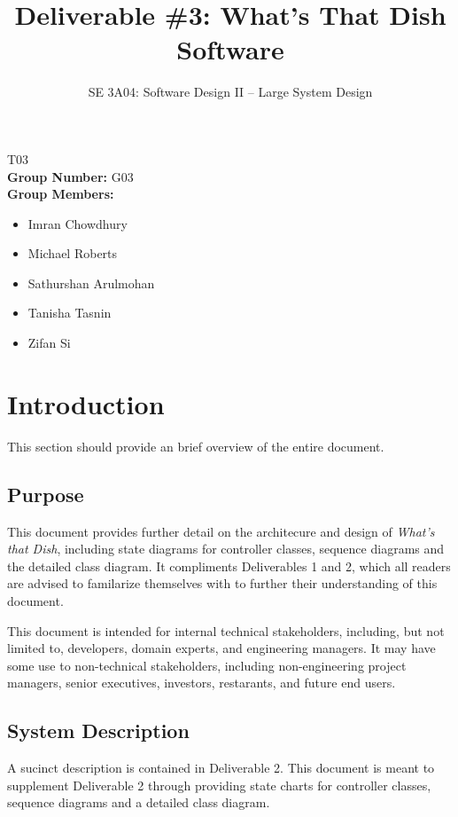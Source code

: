 \documentclass[]{article}
\title{Deliverable \#3: What’s That Dish Software}
\author{SE 3A04: Software Design II -- Large System Design}
\date{}
\begin{document}
\maketitle	
{} T03\\
{\bf Group Number:} G03 \\
{\bf Group Members:} 
\begin{itemize}
	\item Imran Chowdhury
	\item Michael Roberts
	\item Sathurshan Arulmohan
	\item Tanisha Tasnin
	\item Zifan Si
\end{itemize}

\section{Introduction}
\label{sec:introduction}

This section should provide an brief overview of the entire document.

\subsection{Purpose}
\label{sub:purpose}

This document provides further detail on the architecure and design of \textit{What's that Dish}, including state diagrams for controller classes,
sequence diagrams and the detailed class diagram. It compliments Deliverables 1 and 2, which all readers are advised to familarize themselves with
to further their understanding of this document.

This document is intended for internal technical stakeholders, including, but not limited to, developers, domain experts,
and engineering managers. It may have some use to non-technical stakeholders, including non-engineering project managers,
senior executives, investors, restarants, and future end users.

\subsection{System Description}
\label{sub:system_description}
A sucinct description is contained in Deliverable 2. This document is meant to supplement Deliverable 2 through providing 
state charts for controller classes, sequence diagrams and a detailed class diagram.
\end{document}

